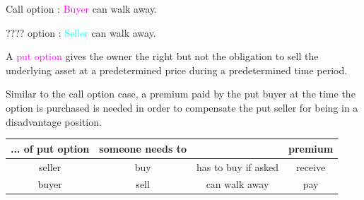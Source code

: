 \def\mySecNum{2.3}
\mySection{\mySecNum~Put options}
\begin{frame}[fragile]
	\begin{center}
		Call option	: \textcolor{magenta}{Buyer} can walk away.

		\bigskip
		\mySeparateLine
		\bigskip

		???? option : \textcolor{cyan}{Seller} can walk away.
	\end{center}
\end{frame}
\begin{frame}[fragile,t]

	\begin{mydefinition}
		A \textcolor{magenta}{put option} gives the owner the right but not the obligation to sell the
		underlying asset at a predetermined price during a predetermined time period.
	\end{mydefinition}
	\bigskip

	\begin{remark}
		Similar to the call option case, a premium paid by the put buyer at the time the option is
		purchased is needed in order to compensate the put seller for being in a disadvantage position.
	\end{remark}
	\bigskip

	\begin{center}
		\renewcommand{\arraystretch}{1.2}
		\begin{tabular}{|c|c|cc|}
			\hline
			... of put option & someone needs to &                     & premium \\ \hline
			seller            & buy              & has to buy if asked & receive \\
			buyer             & sell             & can walk away       & pay     \\
			\hline
		\end{tabular}
	\end{center}
\end{frame}
